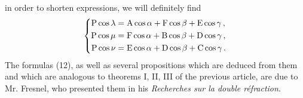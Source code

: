 \documentclass[leqno,openright,smallroyalvopaper,8pt,twoside,showtrims]{memoir}
\begin{document}
in order to shorten expressions, we will definitely find
\begin{equation}
\begin{dcases}
\begin{aligned}
\text{P}\cos\lambda&=\text{A}\cos\alpha+\text{F}\cos\beta+\text{E}\cos\gamma\,,\\
\text{P}\cos\mu&=\text{F}\cos\alpha+\text{B}\cos\beta+\text{D}\cos\gamma\,,\\
\text{P}\cos\nu&=\text{E}\cos\alpha+\text{D}\cos\beta+\text{C}\cos\gamma\,.
\end{aligned}
\end{dcases}
\end{equation}
The formulas (12), as well as several propositions which are deduced from them and which are analogous to theorems I, II, III of the previous article, are due to Mr. Fresnel, who presented them in his \emph{Recherches sur la double r\'efraction}.

\vspace*{.5cm}
\noindent 
\begin{center}
 \quad{}\quad{}\vspace*{.5cm}
 \end{center}
 
\end{document}
